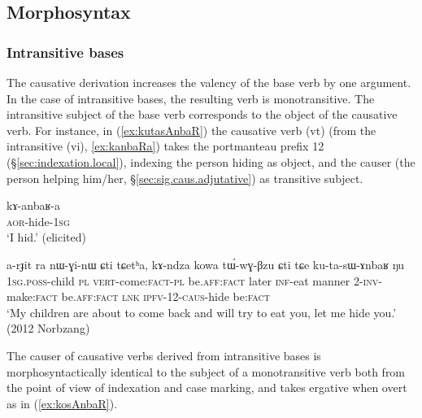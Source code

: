  

\subsection{Morphosyntax} \label{sec:sig.caus.morphosyntax}

\subsubsection{Intransitive bases} \label{sec:sig.caus.intr}
 
The causative derivation increases the valency of the base verb by one argument. In the case of intransitive bases, the resulting verb is monotransitive. The intransitive subject of the base verb  corresponds to the object of the causative verb. For instance, in (\ref{ex:kutasAnbaR}) the causative verb  (vt) (from the intransitive  (vi), \ref{ex:kanbaRa})  takes the portmanteau prefix 1\fl{}2  (§\ref{sec:indexation.local}), indexing the person hiding as object, and the causer (the person helping him/her, §\ref{sec:sig.caus.adjutative}) as transitive subject.

\begin{exe}
\ex \label{ex:kanbaRa}
\gll kɤ-anbaʁ-a \\
\textsc{aor}-hide-\textsc{1sg} \\
\glt `I hid.' (elicited)
\end{exe}

\begin{exe}
\ex \label{ex:kutasAnbaR}
\gll a-rɟit ra nɯ-ɣi-nɯ ɕti tɕetʰa, kɤ-ndza kowa tɯ́-wɣ-βzu ɕti tɕe ku-ta-sɯ-ɤnbaʁ ŋu \\
\textsc{1sg}.\textsc{poss}-child \textsc{pl} \textsc{vert}-come:\textsc{fact}-\textsc{pl} be.\textsc{aff}:\textsc{fact} later \textsc{inf}-eat manner 2-\textsc{inv}-make:\textsc{fact} be.\textsc{aff}:\textsc{fact} \textsc{lnk} \textsc{ipfv}-1\fl{}2-\textsc{caus}-hide be:\textsc{fact} \\
\glt `My children are about to come back and will try to eat you, let me hide you.' (2012 Norbzang)
\end{exe}
 
The causer of causative verbs derived from intransitive bases is morphosyntactically identical to the subject of a monotransitive verb both from the point of view of indexation and case marking, and takes ergative when overt as in (\ref{ex:kosAnbaR}).


